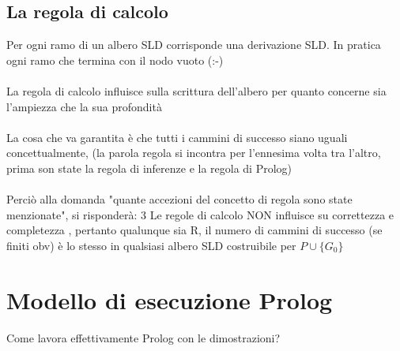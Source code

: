 \documentclass[12pt, a4paper, openany, oneside]{book}
\begin{document}
\section{La regola di calcolo}
Per ogni ramo di un albero SLD corrisponde una derivazione SLD. In pratica ogni 
ramo che termina con il nodo vuoto (:-) \\ \\
La regola di calcolo influisce sulla scrittura dell'albero per quanto concerne
sia l'ampiezza che la sua profondità \\ \\
La cosa che va garantita è che tutti i cammini di successo siano uguali 
concettualmente, (la parola regola si incontra per l'ennesima volta tra l'altro, 
prima son state la regola di inferenze e la regola di Prolog) \\ \\
Perciò alla domanda "quante accezioni del concetto di regola sono state 
menzionate", si risponderà: 3
Le regole di calcolo \color{red} NON \color{black} influisce su \color{red} 
correttezza \color{black} e \color{red} completezza \color{black}, pertanto 
qualunque sia R, il numero di cammini di successo (se finiti obv) è lo stesso
in qualsiasi albero SLD costruibile per $P \cup \{G_{0}\}$
\chapter{Modello di esecuzione Prolog}
Come lavora effettivamente Prolog con le dimostrazioni?\\
\end{document}
